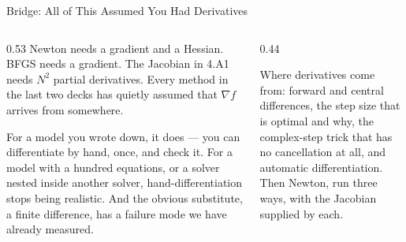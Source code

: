 \begin{frame}{Bridge: All of This Assumed You Had Derivatives}
\begin{columns}[T]
\begin{column}{0.53\textwidth}
\small
Newton needs a gradient and a Hessian. BFGS needs a gradient. The Jacobian in 4.A1 needs $N^{2}$ partial derivatives. Every method in the last two decks has quietly assumed that $\nabla f$ arrives from somewhere.
\medskip

For a model you wrote down, it does --- you can differentiate by hand, once, and check it. For a model with a hundred equations, or a solver nested inside another solver, hand-differentiation stops being realistic. And the obvious substitute, a finite difference, has a failure mode we have already measured.
\end{column}
\begin{column}{0.44\textwidth}
\begin{conceptbox}[title=\textbf{Next (4.A4)}]\small
Where derivatives come from: forward and central differences, the step size that is optimal and why, the complex-step trick that has no cancellation at all, and automatic differentiation.\\[1mm]
Then Newton, run three ways, with the Jacobian supplied by each.
\end{conceptbox}
\end{column}
\end{columns}
\end{frame}


